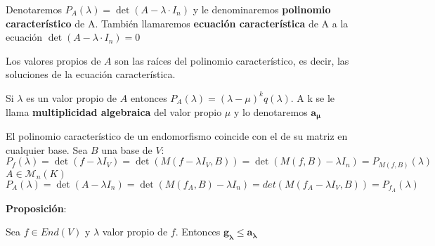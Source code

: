 \documentclass[x11names,table]{report}
\begin{document}
Denotaremos $P_A(\lambda)=\det(A-\lambda\cdot I_n)$ y le denominaremos \textbf{polinomio característico} de A. También llamaremos \textbf{ecuación característica} de A a la ecuación $\det(A-\lambda\cdot I_n)=0$

Los valores propios de $A$ son las raíces del polinomio característico, es decir, las soluciones de la ecuación característica.

Si $\lambda$ es un valor propio de $A$ entonces $P_A(\lambda)=(\lambda-\mu)^k q(\lambda)$. A k se le llama \textbf{multiplicidad algebraica} del valor propio $\mu$ y lo denotaremos $\mathbf{a_\mu}$

El polinomio característico de un endomorfismo coincide con el de su matriz en cualquier base. Sea $B$ una base de $V$:
\[
P_f(\lambda)=\det(f-\lambda I_V)=\det(M(f-\lambda I_V,B))=\det(M(f,B)-\lambda I_n)=P_{M(f,B)}(\lambda)
\]\(
A\in\mathcal{M}_n(K)
\)\[
P_A(\lambda)=\det(A-\lambda I_n)=\det(M(f_A,B)-\lambda I_n)=det(M(f_A-\lambda I_V,B))=P_{f_A}(\lambda)
\]

\textbf{Proposición}:

Sea $f\in End(V)$ y $\lambda$ valor propio de $f$. Entonces $\mathbf{g_\lambda\leq a_\lambda}$
\end{document}
